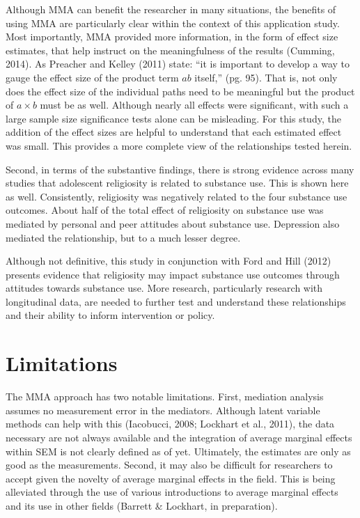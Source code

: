 \documentclass[]{DissertateUSU}
\begin{document}
Although MMA can benefit the researcher in many situations, the benefits
of using MMA are particularly clear within the context of this
application study. Most importantly, MMA provided more information, in
the form of effect size estimates, that help instruct on the
meaningfulness of the results (Cumming, 2014). As Preacher and Kelley
(2011) state: ``it is important to develop a way to gauge the effect
size of the product term \(ab\) itself,'' (pg. 95). That is, not only
does the effect size of the individual paths need to be meaningful but
the product of \(a \times b\) must be as well. Although nearly all
effects were significant, with such a large sample size significance
tests alone can be misleading. For this study, the addition of the
effect sizes are helpful to understand that each estimated effect was
small. This provides a more complete view of the relationships tested
herein.

Second, in terms of the substantive findings, there is strong evidence
across many studies that adolescent religiosity is related to substance
use. This is shown here as well. Consistently, religiosity was
negatively related to the four substance use outcomes. About half of the
total effect of religiosity on substance use was mediated by personal
and peer attitudes about substance use. Depression also mediated the
relationship, but to a much lesser degree.

Although not definitive, this study in conjunction with Ford and Hill
(2012) presents evidence that religiosity may impact substance use
outcomes through attitudes towards substance use. More research,
particularly research with longitudinal data, are needed to further test
and understand these relationships and their ability to inform
intervention or policy.

\section{Limitations}\label{limitations}

The MMA approach has two notable limitations. First, mediation analysis
assumes no measurement error in the mediators. Although latent variable
methods can help with this (Iacobucci, 2008; Lockhart et al., 2011), the
data necessary are not always available and the integration of average
marginal effects within SEM is not clearly defined as of yet.
Ultimately, the estimates are only as good as the measurements. Second,
it may also be difficult for researchers to accept given the novelty of
average marginal effects in the field. This is being alleviated through
the use of various introductions to average marginal effects and its use
in other fields (Barrett \& Lockhart, in preparation).
\end{document}
